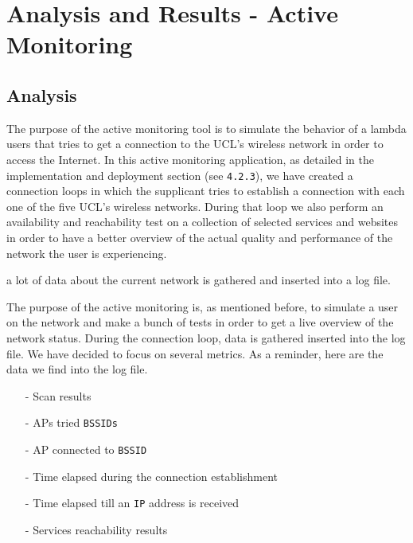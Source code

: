 
\chapter{Analysis and Results - Active Monitoring} %

\label{Chapter6} %





\section{Analysis}
The purpose of the active monitoring tool is to simulate the behavior of a lambda users that tries to get a connection to the UCL's wireless network in order to access the Internet. In this active monitoring application, as detailed in the implementation and deployment section (see \texttt{4.2.3}), we have created a connection loops in which the supplicant tries to establish a connection with each one of the five UCL's wireless networks. During that loop we also perform an availability and reachability test on a collection of selected services and websites in order to have a better overview of the actual quality and performance of the network the user is experiencing.

 a lot of data about the current network is gathered and inserted into a log file.



The purpose of the active monitoring is, as mentioned before, to simulate a user on the network and make a bunch of tests in order to get a live overview of the network status. During the connection loop, data is gathered inserted into the log file. We have decided to focus on several metrics. As a reminder, here are the data we find into the log file.

\begin{itemize}
	\item [-] Scan results
	\item [-] APs tried \texttt{BSSIDs}
	\item [-] AP connected to \texttt{BSSID}
	\item [-] Time elapsed during the connection establishment
	\item [-] Time elapsed till an \texttt{IP} address is received
	\item [-] Services reachability results
\end{itemize}

